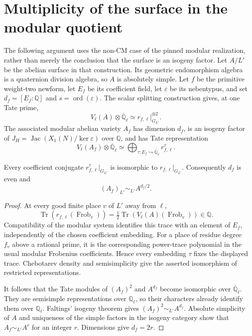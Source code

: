 \section{Multiplicity of the surface in the modular quotient}

The following argument uses the non-CM case of the pinned modular
realization, rather than merely the conclusion that the surface is
an isogeny factor. Let $A/L'$ be the abelian surface in that
construction. Its geometric endomorphism algebra is a quaternion
division algebra, so $A$ is absolutely simple. Let $f$ be the
primitive weight-two newform, let $E_f$ be its coefficient field,
let $\varepsilon$ be its nebentypus, and set
$d_f=[E_f:\mathbb Q]$ and $s=\operatorname{ord}(\varepsilon)$.
The scalar splitting construction gives, at one Tate prime,
\[
 V_\ell(A)\otimes\overline{\mathbb Q}_\ell
       \simeq r_{f,\ell}|_{G_{L'}}^{\oplus2}.
\]
The associated modular abelian variety $A_f$ has dimension $d_f$,
is an isogeny factor of $J_H=\operatorname{Jac}(X_1(N)/\ker\varepsilon)$
over $\mathbb Q$, and has Tate representation
\[
 V_\ell(A_f)\otimes\overline{\mathbb Q}_\ell
       \simeq\bigoplus_{\tau:E_f\hookrightarrow\overline{\mathbb Q}_\ell}
                         r_{f,\ell}^{\tau}.
\]

\begin{lemma}
Every coefficient conjugate $r_{f,\ell}^{\tau}|_{G_{L'}}$ is
isomorphic to $r_{f,\ell}|_{G_{L'}}$. Consequently $d_f$ is even
and
\[
                         (A_f)_{L'}\sim_{L'} A^{d_f/2}.
\]
\end{lemma}
\begin{proof}
At every good finite place $v$ of $L'$ away from $\ell$,
\[
 \operatorname{Tr}(r_{f,\ell}(\operatorname{Frob}_v))
       =\tfrac12\operatorname{Tr}
                    (V_\ell(A)(\operatorname{Frob}_v))\in\mathbb Q.
\]
Compatibility of the modular system identifies this trace with an
element of $E_f$, independently of the chosen coefficient embedding.
For a place of residue degree $f_v$ above a rational prime, it is
the corresponding power-trace polynomial in the usual modular
Frobenius coefficients. Hence every embedding $\tau$ fixes the
displayed trace. Chebotarev density and semisimplicity give the
asserted isomorphism of restricted representations.

It follows that the Tate modules of $(A_f)^2$ and $A^{d_f}$
become isomorphic over $\overline{\mathbb Q}_\ell$. They are
semisimple representations over $\mathbb Q_\ell$, so their
characters already identify them over $\mathbb Q_\ell$. Faltings'
isogeny theorem gives $(A_f)^2\sim_{L'}A^{d_f}$. Absolute
simplicity of $A$ and uniqueness of the simple factors in the
isogeny category show that $A_f\sim_{L'}A^r$ for an integer $r$.
Dimensions give $d_f=2r$.
\end{proof}

